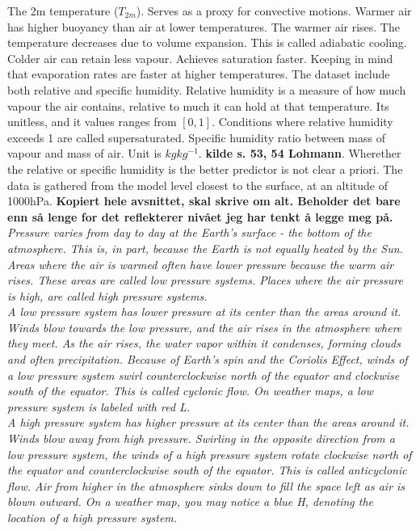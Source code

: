 The 2m temperature ($T_{2m}$). Serves as a proxy for convective motions. Warmer air has higher buoyancy than air at lower temperatures. The warmer air rises. The temperature decreases due to volume expansion. This is called adiabatic cooling. Colder air can retain less vapour. Achieves saturation faster. Keeping in mind that evaporation rates are faster at higher temperatures. The dataset include both relative and specific humidity. Relative humidity is a measure of how much vapour the air contains, relative to much it can hold at that temperature. Its unitless, and it values ranges from $\left[ 0, 1 \right]$.  Conditions where relative humidity exceeds 1 are called supersaturated. Specific humidity ratio between mass of vapour and mass of air. Unit is $kg kg^{-1}$. \textbf{kilde s. 53, 54 Lohmann}. Wherether the relative or specific humidity is the better predictor is not clear a priori. The data is gathered from the model level closest to the surface, at an altitude of 1000hPa. 
\textbf{Kopiert hele avsnittet, skal skrive om alt. Beholder det bare enn så lenge for det reflekterer nivået jeg har tenkt å legge meg på.}
\textit{Pressure varies from day to day at the Earth’s surface - the bottom of the atmosphere. This is, in part, because the Earth is not equally heated by the Sun. Areas where the air is warmed often have lower pressure because the warm air rises. These areas are called low pressure systems. Places where the air pressure is high, are called high pressure systems. \\ 
A low pressure system has lower pressure at its center than the areas around it. Winds blow towards the low pressure, and the air rises in the atmosphere where they meet. As the air rises, the water vapor within it condenses, forming clouds and often precipitation. Because of Earth’s spin and the Coriolis Effect, winds of a low pressure system swirl counterclockwise north of the equator and clockwise south of the equator. This is called cyclonic flow. On weather maps, a low pressure system is labeled with red L.\\ 
A high pressure system has higher pressure at its center than the areas around it. Winds blow away from high pressure. Swirling in the opposite direction from a low pressure system, the winds of a high pressure system rotate clockwise north of the equator and counterclockwise south of the equator. This is called anticyclonic flow. Air from higher in the atmosphere sinks down to fill the space left as air is blown outward. On a weather map, you may notice a blue H, denoting the location of a high pressure system.}

